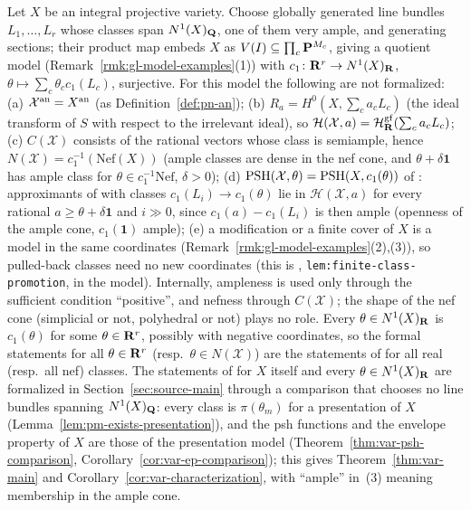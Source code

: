 \begin{remark}\label{rmk:gl-model-comparison}
Let $X$ be an integral projective variety. Choose globally generated line bundles $L_1,\dots,L_r$ whose classes span $N^1(X)_{\mathbf{Q}}$, one of them
very ample, and generating sections; their product map embeds $X$ as $V(I)\subseteq\prod_c\mathbf{P}^{M_c}$, giving a quotient model
(Remark~\ref{rmk:gl-model-examples}(1)) with $c_1\colon\mathbf{R}^r\to N^1(X)_{\mathbf{R}}$, $\theta\mapsto\sum_c\theta_cc_1(L_c)$, surjective. For this model the
following are not formalized: (a)
$\mathcal X^{\mathrm{an}}=X^{\mathrm{an}}$ (as Definition~\ref{def:pn-an}); (b) $R_a=H^0(X,\sum_ca_cL_c)$ (the ideal transform of $S$ with respect to the irrelevant
ideal), so $\mathcal H(\mathcal X,a)=\mathcal H^{\mathrm{gf}}_{\mathbf{R}}(\sum_ca_cL_c)$; (c) $C(\mathcal X)$ consists of the rational vectors whose class is
semiample, hence $N(\mathcal X)=c_1^{-1}(\mathrm{Nef}(X))$ (ample classes are dense in the nef cone, and $\theta+\delta\mathbf 1$ has ample class for
$\theta\in c_1^{-1}\mathrm{Nef}$, $\delta>0$); (d) $\operatorname{PSH}(\mathcal X,\theta)=\operatorname{PSH}(X,c_1(\theta))$ of \cite[Definition~4.1]{BJ22}: approximants of
\cite{BJ22} with classes $c_1(L_i)\to c_1(\theta)$ lie in $\mathcal H(\mathcal X,a)$ for every rational $a\ge\theta+\delta\mathbf1$ and $i\gg0$, since
$c_1(a)-c_1(L_i)$ is then ample (openness of the ample cone, $c_1(\mathbf 1)$ ample); (e) a modification or a finite cover of $X$ is a model in the
same coordinates (Remark~\ref{rmk:gl-model-examples}(2),(3)), so pulled-back classes need no new coordinates (this is
\cite[Lemma~2.6]{FHX}, \texttt{lem:finite-class-promotion}, in the model). Internally, ampleness is used only through the sufficient condition
``positive'', and nefness through $C(\mathcal X)$; the shape of the nef cone (simplicial or not, polyhedral or not) plays no role. Every
$\theta\in N^1(X)_{\mathbf{R}}$ is $c_1(\theta)$ for some $\theta\in\mathbf{R}^r$, possibly with negative coordinates, so the formal statements for all
$\theta\in\mathbf{R}^r$ (resp.\ $\theta\in N(\mathcal X)$) are the statements of \cite{FHX} for all real (resp.\ all nef) classes.
The statements of \cite{FHX} for $X$ itself and every $\theta\in N^1(X)_{\mathbf{R}}$ are formalized in Section~\ref{sec:source-main}
through a comparison that chooses no line bundles spanning $N^1(X)_{\mathbf{Q}}$: every class is $\pi(\theta_m)$ for a presentation
of $X$ (Lemma~\ref{lem:pm-exists-presentation}), and the psh functions and the envelope property of $X$ are those of the
presentation model (Theorem~\ref{thm:var-psh-comparison}, Corollary~\ref{cor:var-ep-comparison}); this gives
Theorem~\ref{thm:var-main} and Corollary~\ref{cor:var-characterization}, with ``ample'' in~(3) meaning membership in the
ample cone.
\end{remark}

